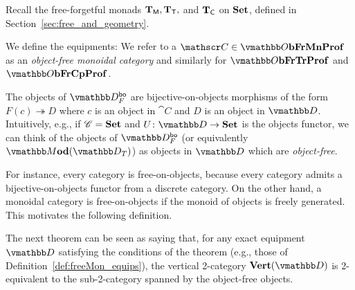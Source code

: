 \documentclass[12pt,oneside,article,draft]{memoir}
\begin{document}
Recall the free-forgetful monads $\mathbf{T}_{\mathsf{M}},\mathbf{T}_{\mathsf{T}},$ and $\mathbf{T}_{\mathsf{C}}$ on $\mathbf{Set}$, defined in Section~\ref{sec:free_and_geometry}. 

\begin{definition}\label{def:freeMon_equips}

We define the equipments:
\centerThis{
   \parbox{1.8in}{
      \begin{align*}
         \dFrMonProf&\coloneqq\dMonProf_{\TM}\\
         \dFrTrProf&\coloneqq \dTrProf_{\TT}\\
         \dFrCompProf&\coloneqq\dCompProf_{\TC}
      \end{align*}
   }
   \qquad
   \parbox{2.5in}{
      \begin{align*}
         \dObFrMonProf&\coloneqq\dMod(\dFrMonProf)\\
         \dObFrTrProf&\coloneqq\dMod(\dFrTrProf)\\
         \dObFrCompProf&\coloneqq\dMod(\dFrCompProf)
      \end{align*}
   }
}
We refer to a $\cat{C}\in\dObFrMonProf$ as an \emph{object-free monoidal category} and similarly for $\dObFrTrProf$ and $\dObFrCompProf$.
\end{definition}

\begin{remark}
   The objects of $\dcat{D}_F^{\bo}$ are bijective-on-objects morphisms of the form
   $F(c)\twoheadrightarrow D$ where $c$ is an object in $\cat{C}$ and $D$ is an object in
   $\dcat{D}$. Intuitively, e.g., if $\mathscr{C}=\mathbf{Set}$ and $U\colon\dcat{D}\to\Set$ is the objects functor, we can think of the objects of $\dcat{D}_F^{\bo}$ (or equivalently
   $\dMod(\dcat{D}_T)$) as objects in $\dcat{D}$ which are \emph{object-free}.
   
   For instance, every category is free-on-objects, because every category admits a
   bijective-on-objects functor from a discrete category. On the other hand, a monoidal category is
   free-on-objects if the monoid of objects is freely generated. This motivates the following definition.
\end{remark}

The next theorem can be seen as saying that, for any exact equipment $\dcat{D}$ satisfying the
conditions of the theorem (e.g., those of Definition~\ref{def:freeMon_equips}), the vertical 2-category $\Ver(\dcat{D})$ is 2-equivalent to the sub-2-category spanned by the object-free objects.
\end{document}
